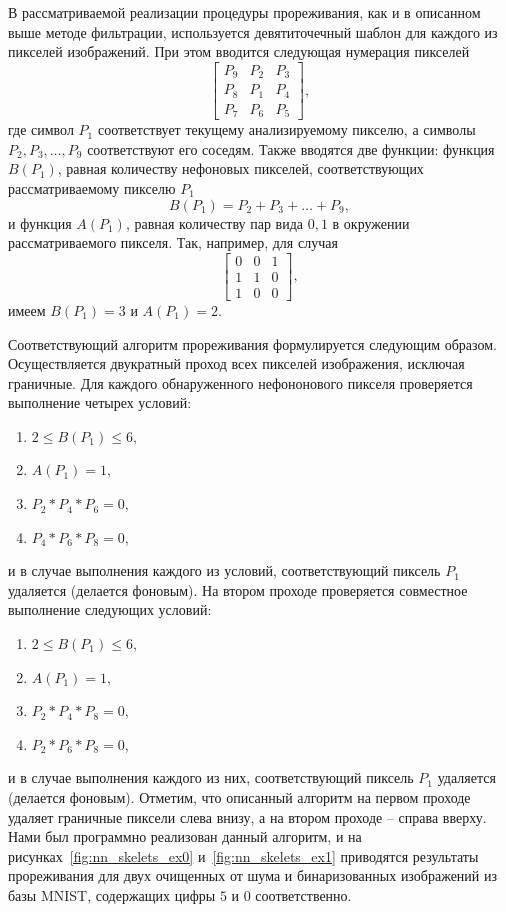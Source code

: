 \documentclass[a4paper,12pt,russian]{article} %
\begin{document}
В рассматриваемой реализации процедуры прореживания, как и в описанном выше методе фильтрации, используется девятиточечный шаблон для каждого из пикселей изображений.
При этом вводится следующая нумерация пикселей
$$
	\begin{bmatrix}
		P_9 & P_2 & P_3 \\
		P_8 & P_1 & P_4 \\
		P_7 & P_6 & P_5
	\end{bmatrix},
$$
где символ $P_1$ соответствует текущему анализируемому пикселю, а символы $P_2, P_3, \ldots, P_9$ соответствуют его соседям.
Также вводятся две функции: функция $B(P_1)$, равная количеству нефоновых пикселей, соответствующих рассматриваемому пикселю $P_1$
$$
	B(P_1) = P_2 + P_3 + \ldots + P_9,
$$
и функция $A(P_1)$, равная количеству пар вида $0, 1$ в окружении рассматриваемого пикселя.
Так, например, для случая
$$
	\begin{bmatrix}
		0 & 0 & 1 \\
		1 & 1 & 0 \\
		1 & 0 & 0
	\end{bmatrix},
$$
имеем $B(P_1)=3$ и $A(P_1)=2$.

Соответствующий алгоритм прореживания формулируется следующим образом.
Осуществляется двукратный проход всех пикселей изображения, исключая граничные.
Для каждого обнаруженного нефононового пикселя проверяется выполнение четырех условий:
\begin{enumerate}
	\item $2 \leq B(P_1) \leq 6$,
	\item $A(P_1) = 1$,
	\item $P_2 * P_4 * P_6 = 0$,
	\item $P_4 * P_6 * P_8 = 0$,
\end{enumerate}
и в случае выполнения каждого из условий, соответствующий пиксель $P_1$ удаляется (делается фоновым).
На втором проходе проверяется совместное выполнение следующих условий:
\begin{enumerate}
	\item $2 \leq B(P_1) \leq 6$,
	\item $A(P_1) = 1$,
	\item $P_2 * P_4 * P_8 = 0$,
	\item $P_2 * P_6 * P_8 = 0$,
\end{enumerate}
и в случае выполнения каждого из них, соответствующий пиксель $P_1$ удаляется (делается фоновым).
Отметим, что описанный алгоритм на первом проходе удаляет граничные пиксели слева внизу, а на втором проходе -- справа вверху.
Нами был программно реализован данный алгоритм, и на рисунках~\ref{fig:nn_skelets_ex0} и~\ref{fig:nn_skelets_ex1} приводятся результаты прореживания для двух очищенных от шума и бинаризованных изображений из базы MNIST, содержащих цифры $5$ и $0$ соответственно.
\end{document}
